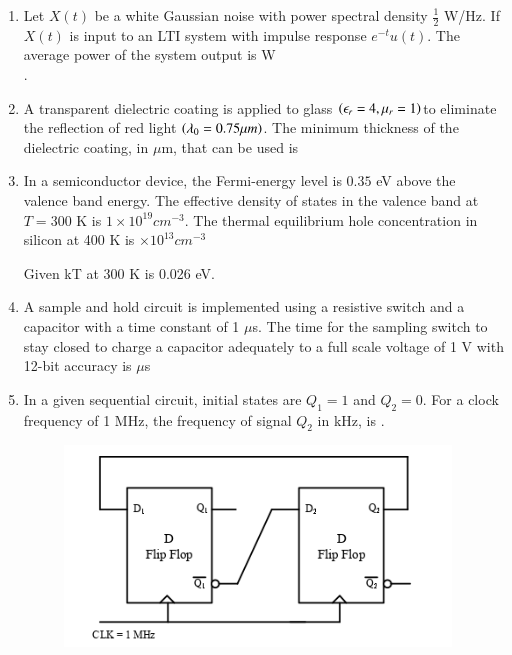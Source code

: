 \documentclass[a4paper, 11pt]{article}
\begin{document}
\begin{enumerate}
    \hfill{}
    
    \item Let $X(t)$ be a white Gaussian noise with power spectral density $\frac{1}{2}$ W/Hz. If $X(t)$ is input to an LTI system with impulse response $e^{-t}u(t)$. The average power of the system output is \underline{\hspace{2cm}} W\\ .
    
    \hfill{}
    
    \item A transparent dielectric coating is applied to glass $\left(\epsilon_r = 4, \mu_r = 1\right) $to eliminate the reflection of red light $\left(\lambda_0 = 0.75 \mu m\right)$. The minimum thickness of the dielectric coating, in $\mu$m, that can be used is \underline{\hspace{2cm}} 
    
    \hfill{}
    
    \item In a semiconductor device, the Fermi-energy level is $0.35$ eV above the valence band energy. The effective density of states in the valence band at $T=300$ K is $1 \times 10^{19} cm^{-3}$. The thermal equilibrium hole concentration in silicon at 400 K is \underline{\hspace{2cm}} $\times 10^{13} cm^{-3}$ 
    
    Given kT at 300 K is 0.026 eV.
    
    \hfill{}
    
    \item A sample and hold circuit is implemented using a resistive switch and a capacitor with a time constant of 1 $\mu$s. The time for the sampling switch to stay closed to charge a capacitor adequately to a full scale voltage of 1 V with 12-bit accuracy is \underline{\hspace{2cm}} $\mu$s 
    
    \hfill{}
    
    \item In a given sequential circuit, initial states are $Q_1=1$ and $Q_2=0$. For a clock frequency of 1 MHz, the frequency of signal $Q_2$ in kHz, is \underline{\hspace{2cm}} .
    \begin{figure}[H]
        \centering
        \includegraphics[width=0.5\columnwidth]{figs/Q53.png}
        \caption*{}
        \label{fig:q63}
    \end{figure}
    

\end{enumerate}
\end{document}
